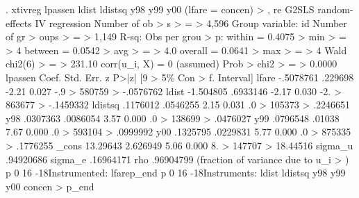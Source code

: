 . xtivreg lpassen ldist ldistsq y98 y99 y00 (lfare = concen)
> , re
{\smallskip}
G2SLS random-effects IV regression              Number of ob
> s                                                         
>       =                                                   
>              4,596
Group variable: id                              Number of gr
> oups                                                      
>       =                                                   
>              1,149
{\smallskip}
R-sq:                                           Obs per grou
> p:
     within  = 0.4075                                       
>   min                                                     
>       =                                                   
>                  4
     between = 0.0542                                       
>   avg                                                     
>       =                                                   
>                4.0
     overall = 0.0641                                       
>   max                                                     
>       =                                                   
>                  4
{\smallskip}
                                                Wald chi2(6)
>       =                                                   
>             231.10
corr(u_i, X)       = 0 (assumed)                Prob > chi2 
>       =                                                   
>             0.0000
{\smallskip}
     lpassen {\VBAR}      Coef.   Std. Err.      z    P>|z|     [9
> 5\% Con                                                    
>       f. Interval]
       lfare {\VBAR}  -.5078761    .229698    -2.21   0.027    -.9
> 580759                                                    
>          -.0576762
       ldist {\VBAR}  -1.504805   .6933146    -2.17   0.030    -2.
> 863677                                                    
>          -.1459332
     ldistsq {\VBAR}   .1176012   .0546255     2.15   0.031     .0
> 105373                                                    
>           .2246651
         y98 {\VBAR}   .0307363   .0086054     3.57   0.000     .0
> 138699                                                    
>           .0476027
         y99 {\VBAR}   .0796548     .01038     7.67   0.000     .0
> 593104                                                    
>           .0999992
         y00 {\VBAR}   .1325795   .0229831     5.77   0.000     .0
> 875335                                                    
>           .1776255
       _cons {\VBAR}   13.29643   2.626949     5.06   0.000     8.
> 147707                                                    
>           18.44516
     sigma_u {\VBAR}  .94920686
     sigma_e {\VBAR}  .16964171
         rho {\VBAR}  .96904799   (fraction of variance due to u_i
> )
{\lbr}p 0 16 -18{\rbr}Instrumented:   lfare{\lbr}p_end{\rbr}
{\lbr}p 0 16 -18{\rbr}Instruments:    ldist ldistsq y98 y99 y00 concen
> {\lbr}p_end{\rbr}
{\smallskip}
